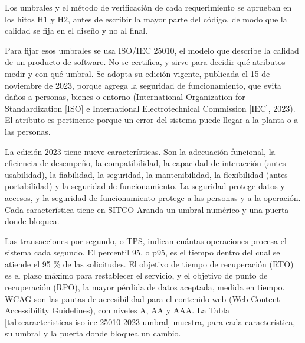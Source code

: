 \documentclass[subdoc]{../../comun/overfore}
\begin{document}
Los umbrales y el método de verificación de cada requerimiento se aprueban en los hitos H1 y H2, antes de escribir la mayor parte del código, de modo que la calidad se fija en el diseño y no al final.

Para fijar esos umbrales se usa ISO/IEC 25010, el modelo que describe la calidad de un producto de software. No se certifica, y sirve para decidir qué atributos medir y con qué umbral. Se adopta su edición vigente, publicada el 15 de noviembre de 2023, porque agrega la seguridad de funcionamiento, que evita daños a personas, bienes o entorno (International Organization for Standardization [ISO] e International Electrotechnical Commission [IEC], 2023). El atributo es pertinente porque un error del sistema puede llegar a la planta o a las personas.

La edición 2023 tiene nueve características. Son la adecuación funcional, la eficiencia de desempeño, la compatibilidad, la capacidad de interacción (antes usabilidad), la fiabilidad, la seguridad, la mantenibilidad, la flexibilidad (antes portabilidad) y la seguridad de funcionamiento. La seguridad protege datos y accesos, y la seguridad de funcionamiento protege a las personas y a la operación. Cada característica tiene en SITCO Aranda un umbral numérico y una puerta donde bloquea.

Las transacciones por segundo, o TPS, indican cuántas operaciones procesa el sistema cada segundo. El percentil 95, o p95, es el tiempo dentro del cual se atiende el 95 \% de las solicitudes. El objetivo de tiempo de recuperación (RTO) es el plazo máximo para restablecer el servicio, y el objetivo de punto de recuperación (RPO), la mayor pérdida de datos aceptada, medida en tiempo. WCAG son las pautas de accesibilidad para el contenido web (Web Content Accessibility Guidelines), con niveles A, AA y AAA. La Tabla \ref{tab:caracteristicas-iso-iec-25010-2023-umbral} muestra, para cada característica, su umbral y la puerta donde bloquea un cambio.
\end{document}
